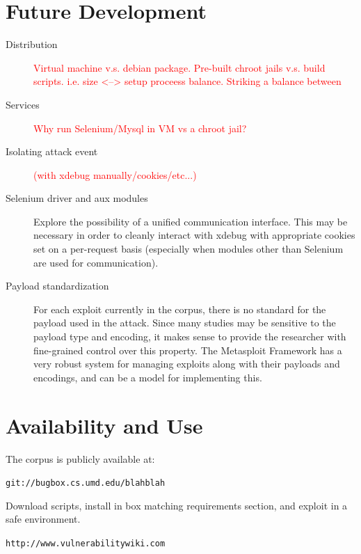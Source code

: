 \documentclass[letterpaper,twocolumn,10pt]{article}
\begin{document}
\section{Future Development}
 \begin{description}
   \item[Distribution]
     \textcolor{red}{Virtual machine v.s. debian package. Pre-built chroot jails v.s. build scripts.
     i.e. size <--> setup proceess balance. Striking a balance between}
   \item[Services]
     \textcolor{red}{Why run Selenium/Mysql in VM vs a chroot jail?}
   \item[Isolating attack event]
     \textcolor{red}{(with xdebug manually/cookies/etc...)}   
   \item[Selenium driver and aux modules]
   Explore the possibility of a unified communication interface. This may be necessary in order to cleanly interact with xdebug with appropriate cookies set on a per-request basis (especially when modules other than Selenium are used for communication).
   \item[Payload standardization]
For each exploit currently in the corpus, there is no standard for the payload used in the attack. Since many studies may be sensitive to the payload type and encoding, it makes sense to provide the researcher with fine-grained control over this property. The Metasploit Framework has a very robust system for managing exploits along with their payloads and encodings, and can be a model for implementing this.
 \end{description}


\section{Availability and Use}

The corpus is publicly available at:

\begin{center}
{\tt git://bugbox.cs.umd.edu/blahblah}
\end{center}

Download scripts, install in box matching requirements section, and exploit in a safe environment.

\begin{center}
{\tt http://www.vulnerabilitywiki.com}
\end{center}

{\footnotesize 
}
\end{document}
